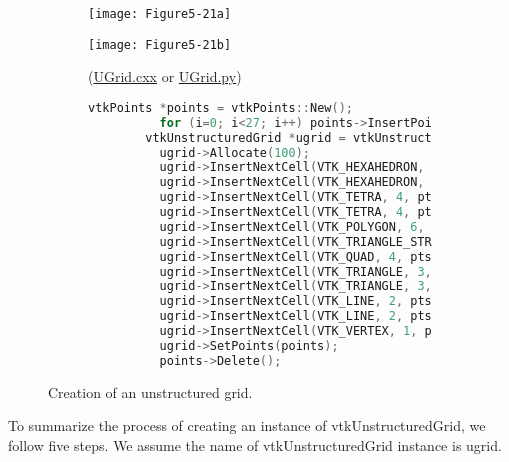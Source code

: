 \begin{figure}[!htb]
	\begin{subfigure}[h]{0.48\linewidth}
		\texttt{[image: Figure5-21a]}
		\caption*{}
		\label{fig:Figure5-21a}
	\end{subfigure}
	\hfill
	\begin{subfigure}[h]{0.48\linewidth}
		\texttt{[image: Figure5-21b]}
		\caption*{(\href{https://lorensen.github.io/VTKExamples/site/Cxx/UnstructuredGrid/UGrid/}{UGrid.cxx} or \href{https://lorensen.github.io/VTKExamples/site/Python/UnstructuredGrid/UGrid/}{UGrid.py})}
		\label{fig:Figure5-21b}
	\end{subfigure}
	\hfill
	\begin{subfigure}[h]{0.96\linewidth}
		\caption*{}
	\end{subfigure}
	\hfill
	\begin{subfigure}[h]{0.96\linewidth}
		\begin{lstlisting}[language=C++, caption={}]
		vtkPoints *points = vtkPoints::New();
		  for (i=0; i<27; i++) points->InsertPoint(i,x[i]);
		vtkUnstructuredGrid *ugrid = vtkUnstructuredGrid::New();
		  ugrid->Allocate(100);
		  ugrid->InsertNextCell(VTK_HEXAHEDRON, 8, pts[0]);
		  ugrid->InsertNextCell(VTK_HEXAHEDRON, 8, pts[1]);
		  ugrid->InsertNextCell(VTK_TETRA, 4, pts[2]);
		  ugrid->InsertNextCell(VTK_TETRA, 4, pts[3]);
		  ugrid->InsertNextCell(VTK_POLYGON, 6, pts[4]);
		  ugrid->InsertNextCell(VTK_TRIANGLE_STRIP, 6, pts[5]);
		  ugrid->InsertNextCell(VTK_QUAD, 4, pts[6]);
		  ugrid->InsertNextCell(VTK_TRIANGLE, 3, pts[7]);
		  ugrid->InsertNextCell(VTK_TRIANGLE, 3, pts[8]);
		  ugrid->InsertNextCell(VTK_LINE, 2, pts[9]);
		  ugrid->InsertNextCell(VTK_LINE, 2, pts[10]);
		  ugrid->InsertNextCell(VTK_VERTEX, 1, pts[11]);
		  ugrid->SetPoints(points);
		  points->Delete();
		\end{lstlisting}
		\caption*{}
		\label{fig:Figure5-21c}
	\end{subfigure}
	\caption{Creation of an unstructured grid.}\label{fig:Figure5-21}
\end{figure}

To summarize the process of creating an instance of vtkUnstructuredGrid, we follow five steps. We assume the name of vtkUnstructuredGrid instance is ugrid.

